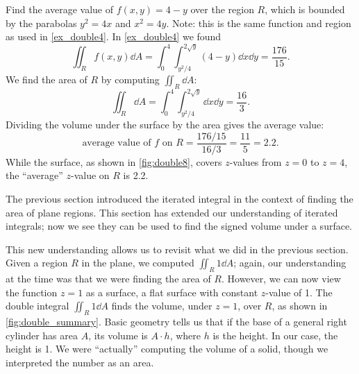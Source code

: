\begin{example}\label{ex_double8}%
Find the average value of $f(x,y) = 4-y$ over the region $R$, which is bounded by the parabolas $y^2=4x$ and $x^2=4y$. Note: this is the same function and region as used in \autoref{ex_double4}.
\solution
In \autoref{ex_double4} we found 
\[\iint_R f(x,y)\dd A = \int_0^4\int_{y^2/4}^{2\sqrt{y}}(4-y)\dd x\dd y = \frac{176}{15}.\] 
We find the area of $R$ by computing $\iint_R \dd A$:
\[\iint_R \dd A = \int_0^4\int_{y^2/4}^{2\sqrt{y}} \dd x\dd y = \frac{16}{3}.\]
Dividing the volume under the surface by the area gives the average value:
\[\text{average value of $f$ on $R$} = \frac{176/15}{16/3} = \frac{11}5 = 2.2.\]
While the surface, as shown in \autoref{fig:double8}, covers $z$-values from $z=0$ to $z=4$, the ``average'' $z$-value on $R$ is 2.2.
\end{example}

%

The previous section introduced the iterated integral in the context of finding the area of plane regions. This section has extended our understanding of iterated integrals; now we see they can be used to find the signed volume under a surface. 

This new understanding allows us to revisit what we did in the previous section. Given a region $R$ in the plane, we computed $\iint_R 1\dd A$; again, our understanding at the time was that we were finding the area of $R$. However, we can now view the function $z=1$ as a surface, a flat surface with constant $z$-value of 1. The double integral $\iint_R 1\dd A$ finds the volume, under $z=1$, over $R$, as shown in \autoref{fig:double_summary}. Basic geometry tells us that if the base of a general right cylinder has area $A$, its volume is $A\cdot h$, where $h$ is the height. In our case, the height is 1. We were ``actually'' computing the volume of a solid, though we interpreted the number as an area.


